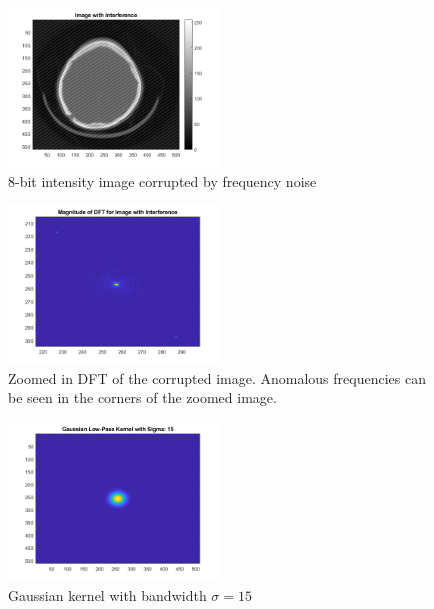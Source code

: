 \documentclass{article}[12 pt]
\begin{document}
\begin{enumerate}
\begin{center}
	\begin{figure}[h!]
		\centering
		\includegraphics[width = 0.5\textwidth]{Images/interference.png}
		\caption{8-bit intensity image corrupted by frequency noise}
		\label{interference}
	\end{figure}
\end{center}
\begin{center}
	\begin{figure}[h!]
		\centering
		\includegraphics[width = 0.5\textwidth]{Images/dftNoisy.png}
		\caption{Zoomed in DFT of the corrupted image.  Anomalous frequencies can be seen in the corners of the zoomed image.}
		\label{dftNoisy}
	\end{figure}
\end{center}
\begin{center}
	\begin{figure}[h!]
		\centering
		\includegraphics[width = 0.5\textwidth]{Images/kernel.png}
		\caption{Gaussian kernel with bandwidth $\sigma = 15$}
		\label{kernel}

\end{figure}
\end{center}
\end{enumerate}
\end{document}
